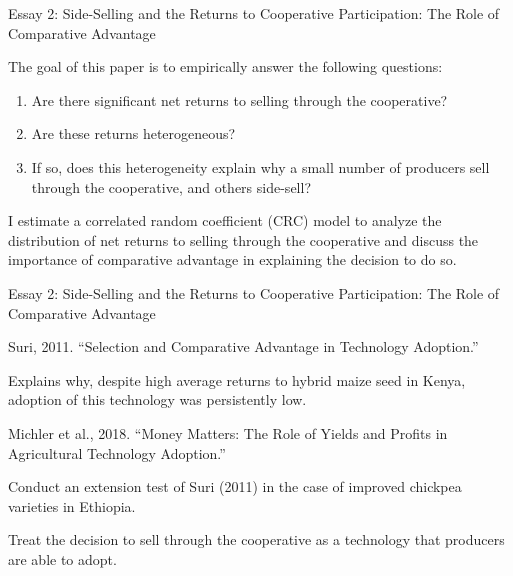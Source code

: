 \documentclass[aspectratio=169]{beamer}
\newenvironment{wideitemize}{\itemize\addtolength{\itemsep}{10pt}}{\enditemize}
\begin{document}
\begin{frame}{Essay 2: Side-Selling and the Returns to Cooperative Participation: The Role of Comparative Advantage}
    \begin{wideitemize}
        \item The goal of this paper is to empirically answer the following questions: \vspace{.25cm}
            \begin{enumerate}
                \item Are there significant net returns to selling through the cooperative? \vspace{.25cm}
                \item Are these returns heterogeneous? \vspace{.25cm}
                \item If so, does this heterogeneity explain why a small number of producers sell through the cooperative, and others side-sell? 
            \end{enumerate}
        \item I estimate a correlated random coefficient (CRC) model to analyze the distribution of net returns to selling through the cooperative and discuss the importance of comparative advantage in explaining the decision to do so.     
    \end{wideitemize}
\end{frame}

\begin{frame}{Essay 2: Side-Selling and the Returns to Cooperative Participation: The Role of Comparative Advantage}
    \begin{wideitemize}
        \item Suri, 2011. ``Selection and Comparative Advantage in Technology Adoption.''
 \vspace{.25cm}
            \begin{wideitemize}
                \item Explains why, despite high average returns to hybrid maize seed in Kenya, adoption of this technology was persistently low.
            \end{wideitemize}
        \item Michler et al., 2018. ``Money Matters: The Role of Yields and Profits in Agricultural Technology Adoption.''
 \vspace{.25cm}
            \begin{wideitemize}
                \item Conduct an extension test of Suri (2011) in the case of improved chickpea varieties in Ethiopia.
            \end{wideitemize}        
        \item Treat the decision to sell through the cooperative as a technology that producers are able to adopt.
    \end{wideitemize}
\end{frame}
\end{document}
